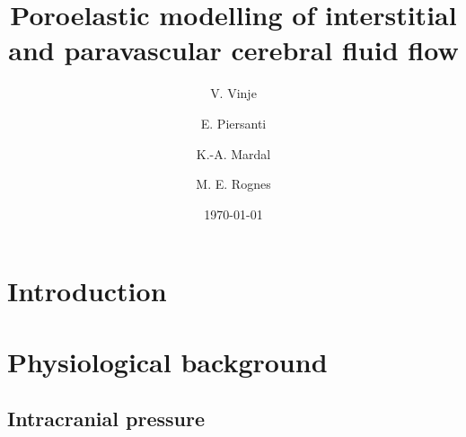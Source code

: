 \documentclass[a4paper,11pt, twopage, reqno]{amsart}
\title{Poroelastic modelling of interstitial and paravascular cerebral
  fluid flow}
\date{\today}
\author{
  V. Vinje
  \and
  E. Piersanti
  \and
  K.-A. Mardal
  \and
  M. E. Rognes}
\begin{document}

\begin{abstract}
\end{abstract}

\maketitle

\section{Introduction}
\label{sec:introduction}


\section{Physiological background}

\citep{LinningerEtAl2016}

\subsection{Intracranial pressure}

\newpage


\end{document}

